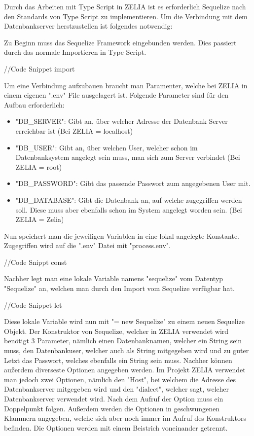 
Durch das Arbeiten mit Type Script in ZELIA ist es erforderlich Sequelize nach den Standards von Type Script zu implementieren. Um die Verbindung mit dem Datenbankserver herstzustellen ist folgendes notwendig:

Zu Beginn muss das Sequelize Framework eingebunden werden. Dies passiert durch das normale Importieren in Type Script.

//Code Snippet import

Um eine Verbindung aufzubauen braucht man Paramenter, welche bei ZELIA in einem eigenen ".env" File ausgelagert ist. Folgende Parameter sind für den Aufbau erforderlich:

\begin{itemize}
    \item "DB\_SERVER": Gibt an, über welcher Adresse der Datenbank Server erreichbar ist (Bei ZELIA = localhost)
    \item "DB\_USER": Gibt an, über welchen User, welcher schon im Datenbanksystem angelegt sein muss, man sich zum Server verbindet (Bei ZELIA = root)
    \item "DB\_PASSWORD": Gibt das passende Passwort zum angegebenen User mit.
    \item "DB\_DATABASE": Gibt die Datenbank an, auf welche zugegriffen werden soll. Diese muss aber ebenfalls schon im System angelegt worden sein. (Bei ZELIA = Zelia)
\end{itemize}

Nun speichert man die jeweiligen Variablen in eine lokal angelegte Konstante. Zugegriffen wird auf die ".env" Datei mit "process.env".

//Code Snippt const

Nachher legt man eine lokale Variable namens "sequelize" vom Datentyp "Sequelize" an, welchen man durch den Import vom Sequelize verfügbar hat.

//Code Snippet let

Diese lokale Variable wird nun mit "= new Sequelize" zu einem neuen Sequelize Objekt. Der Konstruktor von Sequelize, welcher in ZELIA verwendet wird benötigt 3 Parameter, nämlich einen Datenbanknamen, welcher ein String sein muss, den Datenbankuser, welcher auch als String mitgegeben wird und zu guter Letzt das Passwort, welches ebenfalls ein String sein muss. Nachher können außerdem diverseste Optionen angegeben werden. Im Projekt ZELIA verwendet man jedoch zwei Optionen, nämlich den "Host", bei welchem die Adresse des Datenbankserver mitgegeben wird und den "dialect", welcher sagt, welcher Datenbankserver verwendet wird. Nach dem Aufruf der Option muss ein Doppelpunkt folgen. Außerdem werden die Optionen in geschwungenen Klammern angegeben, welche sich aber noch immer im Aufruf des Konstruktors befinden. Die Optionen werden mit einem Beistrich voneinander getrennt.

